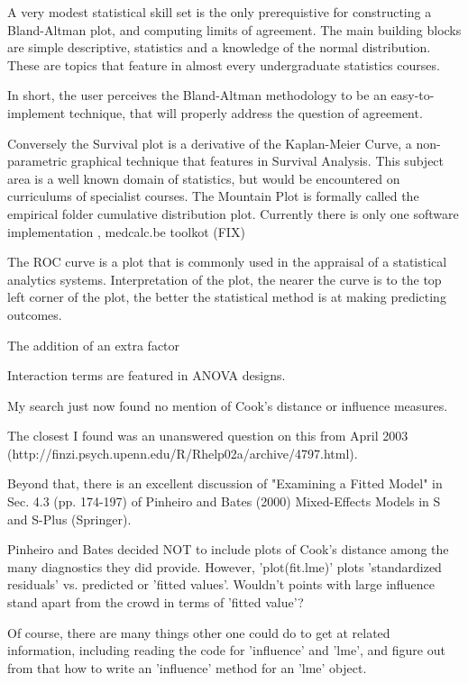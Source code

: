 \documentclass[]{article}
\begin{document}
A very modest statistical skill set is the only prerequistive for constructing a Bland-Altman plot, and computing limits of agreement. The main building blocks 
are simple descriptive, statistics and a knowledge of the normal distribution. These are topics that feature in almost every undergraduate statistics courses.

In short, the user perceives the Bland-Altman methodology to be an easy-to-implement technique, that will properly address the question of agreement.

Conversely the Survival plot is a derivative of the Kaplan-Meier Curve, a non-parametric graphical technique that features in Survival Analysis. This subject area is a well known domain of statistics, but would be encountered 
on curriculums of specialist courses. The Mountain Plot is formally called the empirical folder cumulative distribution plot. 
Currently there is only one software implementation , medcalc.be toolkot (FIX)

The ROC curve is a plot that is commonly used in the appraisal of a statistical analytics systems. Interpretation of the plot, the nearer the curve is to the
top left corner of the plot, the better the statistical method is at making predicting outcomes.

The addition of an extra factor

Interaction terms are featured in ANOVA designs.

My search just now found no mention of Cook's distance or influence measures.  

The closest I found was an unanswered question on this from 
April 2003 (http://finzi.psych.upenn.edu/R/Rhelp02a/archive/4797.html).

Beyond that, there is an excellent discussion of "Examining a Fitted Model" in Sec. 4.3 (pp. 174-197) of Pinheiro and Bates (2000) 
Mixed-Effects Models in S and S-Plus (Springer).  

Pinheiro and Bates decided NOT to include plots of Cook's distance among the many diagnostics they did provide.  
However, 'plot(fit.lme)' plots 'standardized residuals' vs. predicted or 'fitted values'.  
Wouldn't points with large influence stand apart from the crowd in terms of 'fitted value'?

Of course, there are many things other one could do to get at related information, including reading the code for 'influence' and 'lme', and 
figure out from that how to write an 'influence' method for an 'lme' object. 
\end{document}

